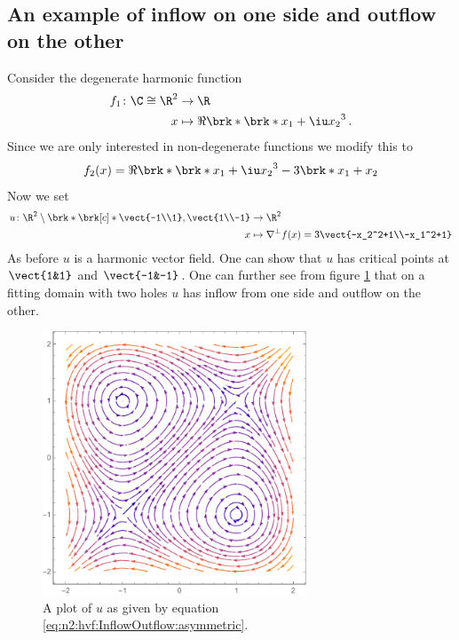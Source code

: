 \subsection{An example of inflow on one side and outflow on the other}
Consider the degenerate harmonic function
\begin{align*}
  f_1\colon\C\cong\R^2&\to\R \\
  x&\mapsto \Re\brk*{\brk*{x_1+\iu x_2}^3}\,.
\end{align*}
Since we are only interested in non-degenerate functions we modify this to
\begin{align*}
  f_2(x)= \Re\brk*{\brk*{x_1+\iu x_2}^3}-3\brk*{x_1+x_2}
\end{align*}
Now we set
\begin{align}
  u\colon\R^2\setminus\brk*{\brk[c]*{\vect{-1\\1},\vect{1\\-1}}}&\to\R^2 \\
  x&\mapsto\nabla^\perp f(x)=3\vect{-x_2^2+1\\-x_1^2+1}\label{eq:n2:hvf:InflowOutflow:asymmetric}
\end{align}
As before $u$ is a harmonic vector field. One can show that $u$ has critical points at $\vect{1&1}$ and
$\vect{-1&-1}$. One can further see from figure \ref{pl:n2:hvf:InflowOutflow:asymmetric}
that on a fitting domain with two holes $u$ has inflow from one side and outflow on the other.

\begin{figure}
  \centering
  \includegraphics[width=0.7\textwidth]{../Plots/n2_hvf_InflowOutflow_asymmetric.pdf}
  \caption{A plot of $u$ as given by equation \eqref{eq:n2:hvf:InflowOutflow:asymmetric}.}
  \label{pl:n2:hvf:InflowOutflow:asymmetric}
\end{figure}

